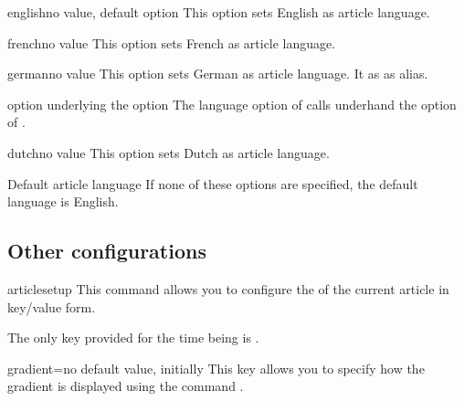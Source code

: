 \documentclass[english,nolocaltoc]{nwejmart}
\newtheorem[style=definition]{fact}
\newtheorem[title=experience]{experience}
\newtheorem[title-plural=rings]{ring}
\newtheorem[title=ideal,title-plural=ideals]{ideal}
\begin{document}
\begin{docKey}{english}{}{no value, default option}
  This option sets English as article language.
\end{docKey}
\begin{docKey}{french}{}{no value}
  This option sets French as article language.
\end{docKey}
\begin{docKey}{german}{}{no value}
  This option sets German as article language. It as  as alias.
  \begin{dbremark}{ option underlying the \protect{} option}{}
    The  language option of \nwejmauthorcl{} calls underhand the  option of .
  \end{dbremark}
\end{docKey}
\begin{docKey}{dutch}{}{no value}
  This option sets Dutch as article language.
\end{docKey}

\begin{dbremark}{Default article language}{}
  If none of these options are specified, the default language is English.
\end{dbremark}

\subsection{Other configurations}
\label{sec:autr-conf}

\begin{docCommand}{articlesetup}{}
  This command allows you to configure the  of the current article in key/value form.

  The only key provided for the time being is .
  \begin{docKey}{gradient}{=\textbar{}}{no default value, initially }
    This key allows you to specify how the gradient is displayed using the command .
  \end{docKey}
\end{docCommand}

\end{document}
